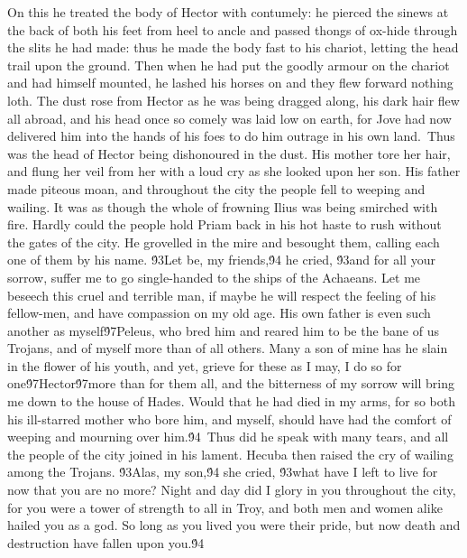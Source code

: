 {On this he treated the body of Hector with contumely: he pierced the sinews at the back of both his feet from heel to ancle and passed thongs of ox-hide through the slits he had made: thus he made the body fast to his chariot, letting the head trail upon the ground. Then when he had put the goodly armour on the chariot and had himself mounted, he lashed his horses on and they flew forward nothing loth. The dust rose from Hector as he was being dragged along, his dark hair flew all abroad, and his head once so comely was laid low on earth, for Jove had now delivered him into the hands of his foes to do him outrage in his own land.\
Thus was the head of Hector being dishonoured in the dust. His mother tore her hair, and flung her veil from her with a loud cry as she looked upon her son. His father made piteous moan, and throughout the city the people fell to weeping and wailing. It was as though the whole of frowning Ilius was being smirched with fire. Hardly could the people hold Priam back in his hot haste to rush without the gates of the city. He grovelled in the mire and besought them, calling each one of them by his name. \'93Let be, my friends,\'94 he cried, \'93and for all your sorrow, suffer me to go single-handed to the ships of the Achaeans. Let me beseech this cruel and terrible man, if maybe he will respect the feeling of his fellow-men, and have compassion on my old age. His own father is even such another as myself\'97Peleus, who bred him and reared him to be the bane of us Trojans, and of myself more than of all others. Many a son of mine has he slain in the flower of his youth, and yet, grieve for these as I may, I do so for one\'97Hector\'97more than for them all, and the bitterness of my sorrow will bring me down to the house of Hades. Would that he had died in my arms, for so both his ill-starred mother who bore him, and myself, should have had the comfort of weeping and mourning over him.\'94\
Thus did he speak with many tears, and all the people of the city joined in his lament. Hecuba then raised the cry of wailing among the Trojans. \'93Alas, my son,\'94 she cried, \'93what have I left to live for now that you are no more? Night and day did I glory in you throughout the city, for you were a tower of strength to all in Troy, and both men and women alike hailed you as a god. So long as you lived you were their pride, but now death and destruction have fallen upon you.\'94\
}
